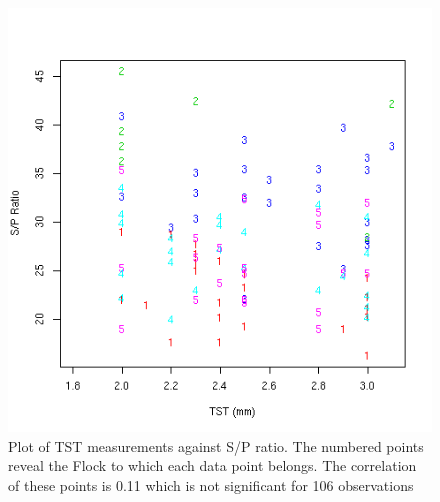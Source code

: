 %

\begin{figure}[!h]
  \centering
  \includegraphics[width=1.0\textwidth]{sptst.png}
  \caption{Plot of TST measurements against S/P ratio. The numbered points reveal the Flock to which each data point belongs. The correlation of these points is 0.11 which is not significant for 106 observations}
  \label{fig:sptst}
\end{figure}

%

